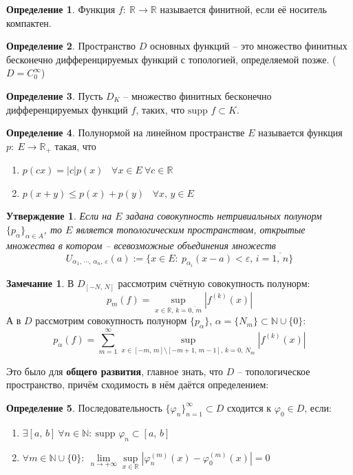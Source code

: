 \documentclass[a4paper,12pt]{article}
\renewcommand{\phi}{\ensuremath{\varphi}}
\renewcommand{\leq}{\ensuremath{\leqslant}}
\theoremstyle{plain}
\newtheorem{proposition}{Утверждение}[section]
\theoremstyle{definition}
\newtheorem{definition}{Определение}[section]
\newtheorem*{note}{Замечание}
\theoremstyle{remark}
\begin{document}
\begin{definition}
	Функция $f:\: \mathbb{R} \to \mathbb{R}$ называется финитной, если её носитель компактен.
\end{definition}

\begin{definition}
	Пространство $D$ основных функций -- это множество финитных бесконечно дифференцируемых функций с топологией, определяемой позже. ($D = C_0^\infty$)
\end{definition}

\begin{definition}
	Пусть $D_K$ -- множество финитных бесконечно дифференцируемых функций $f$, таких, что $\text{supp }f \subset K$.
\end{definition}

\begin{definition}
	Полунормой на линейном пространстве $E$ называется функция $p:\: E \to \mathbb{R}_+$ такая, что
	\begin{enumerate}
		\item $p(cx) = |c|p(x)\;\;\; \forall x \in E \: \forall c \in \mathbb{R}$
		\item $p(x + y) \leq p(x) + p(y)\;\;\; \forall x,\, y \in E$
	\end{enumerate}
\end{definition}

\begin{proposition}
	Если на $E$ задана совокупность нетривиальных полунорм $\{p_\alpha\}_{\alpha \in A}$, то $E$ является топологическим пространством, открытые множества в котором -- всевозможные объединения множеств
	\[U_{\alpha_1,\,\cdots,\,\alpha_n,\, \varepsilon}(a) := \{x \in E:\: p_{\alpha_i}(x - a) < \varepsilon,\, i = \overline{1,\,n}\}\]
\end{proposition}

\begin{note}
	В $D_{[-N,\,N]}$ рассмотрим счётную совокупность полунорм:
	\[p_m(f) = \sup_{x \in \mathbb{R},\, k = \overline{0,\,m}}|f^{(k)}(x)|\]
	А в $D$ рассмотрим совокупность полунорм $\{p_\alpha\},\, \alpha = \{N_m\}\subset \mathbb{N} \cup \{0\}$:
	\[p_\alpha(f) = \sum_{m = 1}^\infty \sup_{x \in [-m,\,m]\setminus[-m + 1,\, m - 1],\, k =\overline{0,\, N_m}} |f^{(k)}(x)|\]
\end{note}

Это было для \textbf{общего развития}, главное знать, что $D$ -- топологическое пространство, причём сходимость в нём даётся определением:
\begin{definition}
	Последовательность $\{\phi_n\}_{n = 1}^\infty \subset D$ сходится к $\phi_0 \in D$, если:
	\begin{enumerate}
		\item $\exists [a,\,b] \: \forall n \in \mathbb{N}:\: \text{supp }\phi_n \subset [a,\,b]$
		\item $\forall m \in \mathbb{N} \cup \{0\}:\: \lim\limits_{n \to +\infty} \sup\limits_{x \in \mathbb{R}}|\phi_n^{(m)}(x) - \phi_0^{(m)}(x)| = 0$
	\end{enumerate}
\end{definition}
\end{document}
